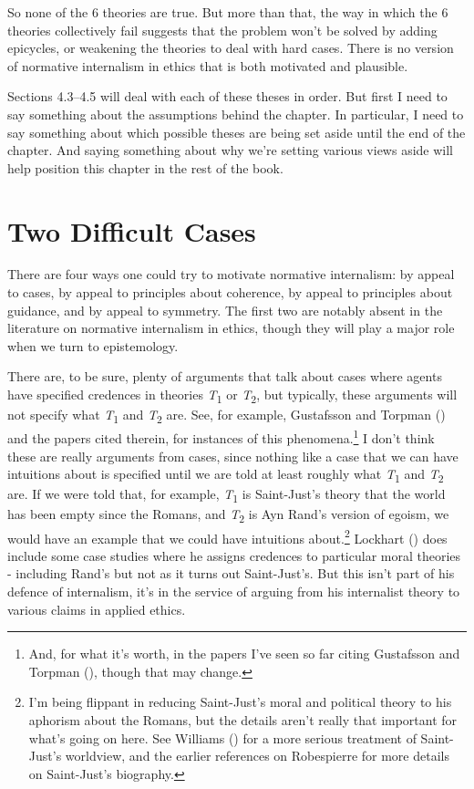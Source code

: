 \documentclass[
  10pt,
  letterpaper,
  twoside]{scrbook}
\begin{document}
So none of the 6 theories are true. But more than that, the way in which
the 6 theories collectively fail suggests that the problem won't be
solved by adding epicycles, or weakening the theories to deal with hard
cases. There is no version of normative internalism in ethics that is
both motivated and plausible.

Sections 4.3--4.5 will deal with each of these theses in order. But
first I need to say something about the assumptions behind the chapter.
In particular, I need to say something about which possible theses are
being set aside until the end of the chapter. And saying something about
why we're setting various views aside will help position this chapter in
the rest of the book.

\section{Two Difficult Cases}\label{twodifficultcases}

There are four ways one could try to motivate normative internalism: by
appeal to cases, by appeal to principles about coherence, by appeal to
principles about guidance, and by appeal to symmetry. The first two are
notably absent in the literature on normative internalism in ethics,
though they will play a major role when we turn to epistemology.

There are, to be sure, plenty of arguments that talk about cases where
agents have specified credences in theories \emph{T}\textsubscript{1} or
\emph{T}\textsubscript{2}, but typically, these arguments will not
specify what \emph{T}\textsubscript{1} and \emph{T}\textsubscript{2}
are. See, for example, Gustafsson and Torpman
() and the papers cited
therein, for instances of this phenomena.\footnote{And, for what it's
  worth, in the papers I've seen so far citing Gustafsson and Torpman
  (), though that may change.}
I don't think these are really arguments from cases, since nothing like
a case that we can have intuitions about is specified until we are told
at least roughly what \emph{T}\textsubscript{1} and
\emph{T}\textsubscript{2} are. If we were told that, for example,
\emph{T}\textsubscript{1} is {Saint-Just}'s theory that the world has
been empty since the Romans, and \emph{T}\textsubscript{2} is Ayn Rand's
version of egoism, we would have an example that we could have
intuitions about.\footnote{I'm being flippant in reducing {Saint-Just}'s
  moral and political theory to his aphorism about the Romans, but the
  details aren't really that important for what's going on here. See
  Williams () for a more serious
  treatment of {Saint-Just}'s worldview, and the earlier references on
  {Robespierre} for more details on {Saint-Just}'s biography.} Lockhart
() does include some case studies where
he assigns credences to particular moral theories - including Rand's but
not as it turns out {Saint-Just}'s. But this isn't part of his defence
of internalism, it's in the service of arguing from his internalist
theory to various claims in applied ethics.
\end{document}
